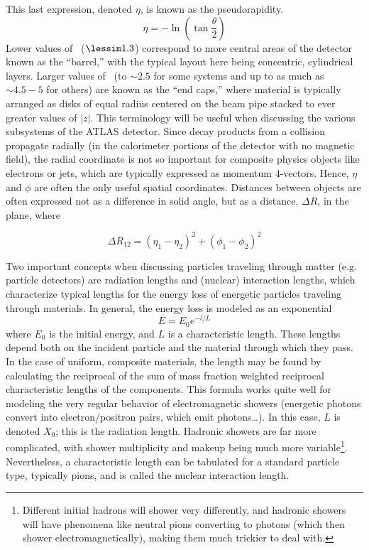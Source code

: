 This last expression, denoted $\eta$, is known as the pseudorapidity.  
\begin{equation}
\eta=-\ln\left(\tan\frac{\theta}{2}\right)
\end{equation}
Lower values of \aeta\, ($\lessim 1.3$) correspond to more central areas of the detector known as the ``barrel,'' with the typical layout here being concentric, cylindrical layers.  Larger values of \aeta\, (to $\sim2.5$ for some systems and up to as much as $\sim 4.5-5$ for others) are known as the ``end caps,'' where material is typically arranged as disks of equal radius centered on the beam pipe stacked to ever greater values of $\left|z\right|$.  This terminology will be useful when discussing the various subsystems of the ATLAS detector.  Since decay products from a collision propagate radially (in the calorimeter portions of the detector with no magnetic field), the radial coordinate is not so important for composite physics objects like electrons or jets, which are typically expressed as momentum 4-vectors.  Hence, $\eta$ and $\phi$ are often the only useful spatial coordinates.  Distances between objects are often expressed not as a difference in solid angle, but as a distance, $\Delta R$, in the \ephi\,plane, where

\begin{equation}
\Delta R_{12} = \left(\eta_1-\eta_2\right)^2+\left(\phi_1-\phi_2\right)^2
\end{equation}

Two important concepts when discussing particles traveling through matter (e.g. particle detectors) are radiation lengths and (nuclear) interaction lengths,  which characterize typical lengths for the energy loss of energetic particles traveling through materials.  In general, the energy loss is modeled as an exponential
\begin{equation}
E=E_0e^{-l/L}
\end{equation}
where $E_0$ is the initial energy, and $L$ is a characteristic length.  These lengths depend both on the incident particle and the material through which they pass.  In the case of uniform, composite materials, the length may be found by calculating the reciprocal of the sum of mass fraction weighted reciprocal characteristic lengths of the components.  This formula works quite well for modeling the very regular behavior of electromagnetic showers (energetic photons convert into electron/positron pairs, which emit photons\ldots).  In this case, $L$ is denoted $X_0$; this is the radiation length.  Hadronic showers are far more complicated, with shower multiplicity and makeup being much more variable\footnote{Different initial hadrons will shower very differently, and hadronic showers will have phenomena like neutral pions converting to photons (which then shower electromagnetically), making them much trickier to deal with.}.  Nevertheless, a characteristic length can be tabulated for a standard particle type, typically pions, and is called the nuclear interaction length.

